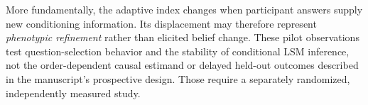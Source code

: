 More fundamentally, the adaptive index changes when participant answers
supply new conditioning information. Its displacement may therefore
represent \emph{phenotypic refinement} rather than elicited belief change.
These pilot observations test question-selection behavior and the stability
of conditional LSM inference, not the order-dependent causal estimand or
delayed held-out outcomes described in the manuscript's prospective design.
Those require a separately randomized, independently measured study.
